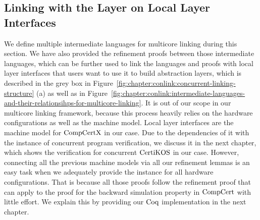 
\subsection{Linking with the Layer on Local Layer Interfaces}
\label{chapter:linking:subsec:linking-with-the-layer-on-local-layer-interface}


We define multiple intermediate languages for multicore linking during this section.
We have also provided the refinement proofs between those intermediate languages, which can be further used to link the languages and proofs with  local layer interfaces that users want to use 
it to build abstraction layers, which is described in the grey box in Figure~\ref{fig:chapter:conlink:concurrent-linking-structure} (a) as well as in Figure~\ref{fig:chapter:conlink:intermediate-languages-and-their-relationsihps-for-multicore-linking}.
It is out of our scope in our multicore linking framework,
because this process heavily relies on the hardware configurations as well as the machine model.
Local layer interfaces are the machine model for $\mathrm{CompCertX}$ in our case. 
Due to the dependencies of it with the instance of concurrent program verification, 
we discuss it in the next chapter, which shows the verification for concurrent $\mathrm{CertiKOS}$ in our case. 
However, connecting all the previous machine models via
all our refinement lemmas is an
easy task when we adequately provide the instance for all hardware configurations.
That is because all those proofs follow the refinement proof that can apply to the proof for the backward simulation property in $\mathrm{CompCert}$ with little effort. 
We explain this by providing our $\mathrm{Coq}$ implementation in the next chapter.
